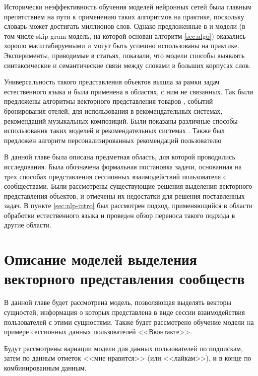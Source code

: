 \documentclass[times,specification,annotation]{itmo-student-thesis}
\begin{document}
Исторически неэффективность обучения моделей нейронных сетей была главным препятствием на пути к применению таких алгоритмов на практике, поскольку словарь может достигать миллионов слов. Однако предложенные в \cite{mikolov2013efficient} и \cite{mikolov2013distributed} модели (в том числе skip-gram модель, на которой основан алгоритм \ref{sec:algo}) оказались хорошо масштабируемыми и могут быть успешно использованы на практике. Эксперименты, приводимые в статьях, показали, что модели способы выявлять синтаксические и семантические связи между словами в больших корпусах слов. 

Универсальность такого представления объектов вышла за рамки задач естественного языка и была применена в областях, с ним не связанных. Так были предложены алгоритмы векторного представления товаров \cite{grbovic2015commerce}\cite{Vasile2016}, событий бронирования отелей\cite{airbnb}, для использования в рекомендательных системах, рекомендаций музыкальных композиций\cite{cheng2017exploiting}. Были показаны различные способы использования таких моделей в рекомендательных системах \cite{ozsoy2016word}. Также был предложен алгоритм персонализированных рекомендаций пользователю \cite{manotumruksa2016modelling}

\chapterconclusion

В данной главе была описана предметная область, для которой проводились исследования. Была обозначена формальная постановка задачи, основанная на трeх способах представления сессионных взаимодействий пользователя с сообществами. Были рассмотрены существующие решения выделения векторного представления объектов, и отмечены их недостатки для решения поставленных задач. В пункте \ref{sec:nlp-intro} был рассмотрен подход, применяющийся в области обработки естественного языка и проведeн обзор переноса такого подхода в другие области.   

\finishrelatedwork

\chapter{Описание моделей выделения векторного представления сообществ}

В данной главе будет рассмотрена модель, позволяющая выделять векторы
сущностей, информация о которых представлена в виде сессии взаимодействия
пользователей с этими сущностями.
Также будет рассмотрено обучение модели на примере сессионных данных пользователей <<Вконтакте>>. 

Будут рассмотрены вариации модели для данных пользователей по подпискам, затем по данным отметок <<мне нравится>> (или <<лайкам>>), и в конце по комбинированным данным.
\end{document}

